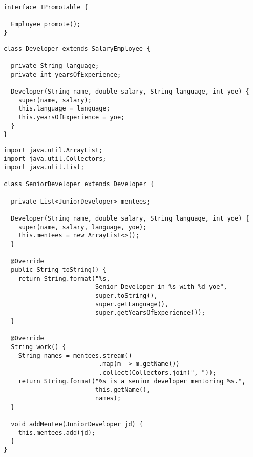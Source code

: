 \begin{lstlisting}[language=MyJava]
interface IPromotable {

  Employee promote();
}
\end{lstlisting}

\enlargethispage{-2\baselineskip}
\begin{lstlisting}[language=MyJava]
class Developer extends SalaryEmployee {

  private String language;
  private int yearsOfExperience;

  Developer(String name, double salary, String language, int yoe) {
    super(name, salary);
    this.language = language;
    this.yearsOfExperience = yoe;
  }
}
\end{lstlisting}

\begin{lstlisting}[language=MyJava]
import java.util.ArrayList;
import java.util.Collectors;
import java.util.List;

class SeniorDeveloper extends Developer {

  private List<JuniorDeveloper> mentees;

  Developer(String name, double salary, String language, int yoe) {
    super(name, salary, language, yoe);
    this.mentees = new ArrayList<>();
  }

  @Override
  public String toString() {
    return String.format("%s, 
                         Senior Developer in %s with %d yoe", 
                         super.toString(), 
                         super.getLanguage(),
                         super.getYearsOfExperience());
  }

  @Override
  String work() {
    String names = mentees.stream()
                          .map(m -> m.getName())
                          .collect(Collectors.join(", "));
    return String.format("%s is a senior developer mentoring %s.", 
                         this.getName(), 
                         names);
  }

  void addMentee(JuniorDeveloper jd) {
    this.mentees.add(jd);
  }
}
\end{lstlisting}


